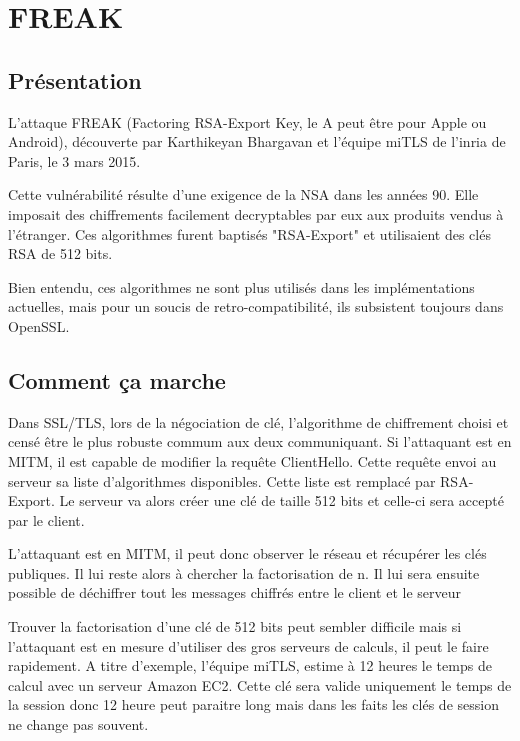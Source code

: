 \chapter{FREAK}
\label{chap:freak}

\section{Présentation}
\label{sec:pFreak}

L'attaque FREAK (Factoring RSA-Export Key, le A peut être pour Apple ou Android), découverte
par Karthikeyan Bhargavan et l'équipe miTLS de l'inria de Paris, le 3 mars 2015.


Cette vulnérabilité résulte d'une exigence de la NSA dans les années 90. Elle imposait des chiffrements
facilement decryptables par eux aux produits vendus à l'étranger.
Ces algorithmes furent baptisés "RSA-Export" et utilisaient des clés RSA de 512 bits.


Bien entendu, ces algorithmes ne sont plus utilisés dans les implémentations actuelles, mais pour un soucis de retro-compatibilité, ils subsistent toujours dans OpenSSL.

\section{Comment ça marche}
\label{sec:ccmFreak}

Dans SSL/TLS, lors de la négociation de clé, l'algorithme de chiffrement choisi et censé être le plus
robuste commum aux deux communiquant. Si l'attaquant est en MITM, il est capable de modifier la requête ClientHello.
Cette requête envoi au serveur sa liste d'algorithmes disponibles. Cette liste est remplacé par RSA-Export. Le serveur
va alors créer une clé de taille 512 bits et celle-ci sera accepté par le client.

L'attaquant est en MITM, il peut donc observer le réseau et récupérer les clés publiques. Il lui reste alors à 
chercher la factorisation de n. Il lui sera ensuite possible de déchiffrer tout les messages chiffrés entre le
client et le serveur

Trouver la factorisation d'une clé de 512 bits peut sembler difficile mais si l'attaquant est en mesure d'utiliser
des gros serveurs de calculs, il peut le faire rapidement. A titre d'exemple, l'équipe miTLS, estime à 12 heures le temps de calcul avec un serveur Amazon EC2. Cette clé sera valide uniquement le temps de la session donc 12 heure 
peut paraitre long mais dans les faits les clés de session ne change pas souvent.


